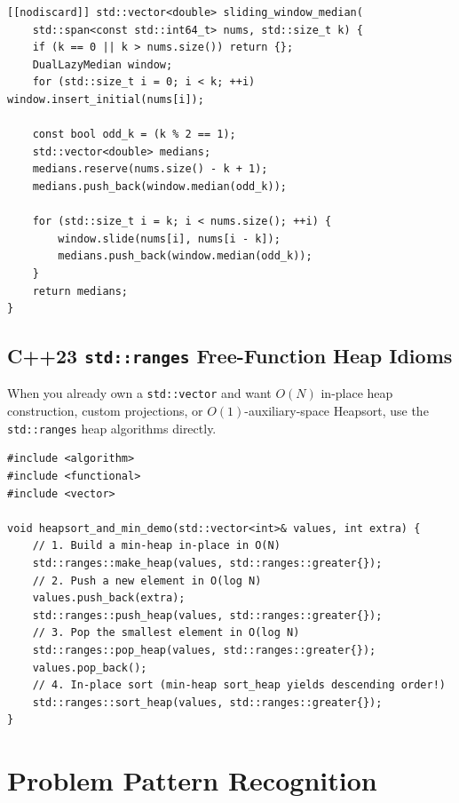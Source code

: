 \documentclass[11pt,a4paper]{article}
\theoremstyle{definition}
\begin{document}
\begin{lstlisting}[caption={Sliding Window Median in $O(N \log N)$ time using lazy deletion and logical counts.}]
[[nodiscard]] std::vector<double> sliding_window_median(
    std::span<const std::int64_t> nums, std::size_t k) {
    if (k == 0 || k > nums.size()) return {};
    DualLazyMedian window;
    for (std::size_t i = 0; i < k; ++i) window.insert_initial(nums[i]);

    const bool odd_k = (k % 2 == 1);
    std::vector<double> medians;
    medians.reserve(nums.size() - k + 1);
    medians.push_back(window.median(odd_k));

    for (std::size_t i = k; i < nums.size(); ++i) {
        window.slide(nums[i], nums[i - k]);
        medians.push_back(window.median(odd_k));
    }
    return medians;
}
\end{lstlisting}

\subsection{C++23 \texttt{std::ranges} Free-Function Heap Idioms}

When you already own a \texttt{std::vector} and want $O(N)$ in-place heap construction, custom projections, or $O(1)$-auxiliary-space Heapsort, use the \texttt{std::ranges} heap algorithms directly.

\begin{lstlisting}[caption={In-place $O(N)$ \texttt{make\_heap}, \texttt{push\_heap}, \texttt{pop\_heap}, and \texttt{sort\_heap} with C++23 ranges.}]
#include <algorithm>
#include <functional>
#include <vector>

void heapsort_and_min_demo(std::vector<int>& values, int extra) {
    // 1. Build a min-heap in-place in O(N)
    std::ranges::make_heap(values, std::ranges::greater{});
    // 2. Push a new element in O(log N)
    values.push_back(extra);
    std::ranges::push_heap(values, std::ranges::greater{});
    // 3. Pop the smallest element in O(log N)
    std::ranges::pop_heap(values, std::ranges::greater{});
    values.pop_back();
    // 4. In-place sort (min-heap sort_heap yields descending order!)
    std::ranges::sort_heap(values, std::ranges::greater{});
}
\end{lstlisting}

\section{Problem Pattern Recognition}
\end{document}
